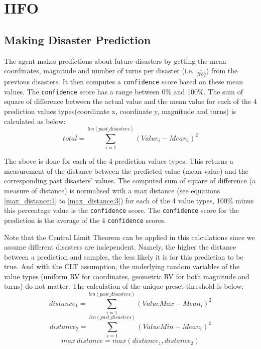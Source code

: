 \section{IIFO}\label{sec:team4:IIFO}

\subsection{Making Disaster Prediction}
The agent makes predictions about future disasters by getting the mean coordinates, magnitude and number of turns per disaster (i.e. $\frac{1}{freq}$) from the previous disasters. It then computes a \texttt{confidence} score based on these mean values. The \texttt{confidence} score has a range between 0\% and 100\%. The sum of square of difference between the actual value and the mean value for each of the 4 prediction values types(coordinate x, coordinate y, magnitude and turns) is calculated as below:
\begin{equation}
    total = \sum_{i=1}^{len(past\_disasters)}(Value_i - Mean_i)^2
\end{equation}

The above is done for each of the 4 prediction values types. This returns a measurement of the distance between the predicted value (mean value) and the corresponding past disasters' values. The computed sum of square of difference (a measure of distance) is normalised with a max distance (see equations \ref{max_distance:1} to \ref{max_distance:3}) for each of the 4 value types, 100\% minus this percentage value is the \texttt{confidence} score. The \texttt{confidence} score for the prediction is the average of the 4 \texttt{confidence} scores.

Note that the Central Limit Theorem can be applied in this calculations since we assume different disasters are independent. Namely, the higher the distance between a prediction and samples, the less likely it is for this prediction to be true. And with the CLT assumption, the underlying random variables of the value types (uniform RV for coordinates, geometric RV for both magnitude and turns) do not matter. The calculation of the unique preset threshold is below:
\begin{equation}\label{max_distance:1}
    distance_1 = \sum_{i=1}^{len(past\_disasters)}(ValueMax - Mean_i)^2
\end{equation}
\begin{equation}\label{max_distance:2}
    distance_2 = \sum_{i=1}^{len(past\_disasters)}(ValueMin - Mean_i)^2
\end{equation}
\begin{equation}\label{max_distance:3}
    max\: distance = max (distance_1, distance_2)
\end{equation}


